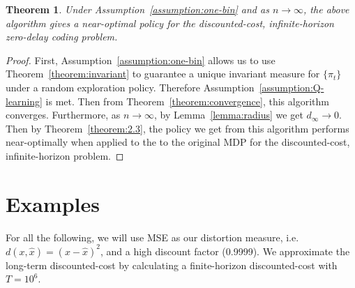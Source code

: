 \documentclass[conference, draftcls, onecolumn]{IEEEtran}
\newtheorem{theorem}{Theorem}
\begin{document}
\begin{theorem}
    Under Assumption~\ref{assumption:one-bin} and as \(n \to \infty\), the above algorithm gives a near-optimal policy for the discounted-cost, infinite-horizon zero-delay coding problem.
\end{theorem}
\begin{proof}
    First, Assumption~\ref{assumption:one-bin} allows us to use Theorem~\ref{theorem:invariant} to guarantee a unique invariant measure for \(\{\pi_t\}\) under a random exploration policy. Therefore Assumption~\ref{assumption:Q-learning} is met. Then from Theorem~\ref{theorem:convergence}, this algorithm converges. Furthermore, as \(n \to \infty\), by Lemma~\ref{lemma:radius} we get \(d_\infty \to 0\). Then by Theorem~\ref{theorem:2.3}, the policy we get from this algorithm performs near-optimally when applied to the to the original MDP for the discounted-cost, infinite-horizon problem.
\end{proof}

\section{Examples}\label{section:results}
For all the following, we will use MSE as our distortion measure, i.e. \( d(x,\hat{x}) = (x - \hat{x})^2 \), and a high discount factor (0.9999). We approximate the long-term discounted-cost by calculating a finite-horizon discounted-cost with \(T=10^6\).
\end{document}
